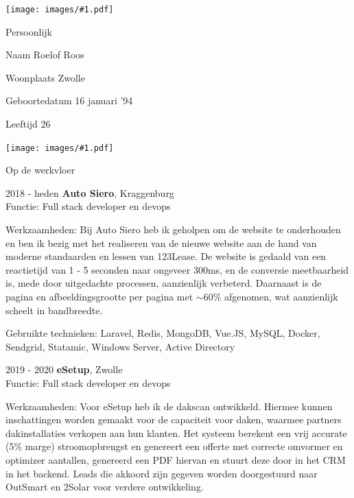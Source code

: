 \documentclass[12pt, a4paper]{article}
\newcommand*{\pdficon}[1]{
    \vspace{10mm}
    \hspace*{-25mm}
    \texttt{[image: images/\#1.pdf]}
    \vspace{-12mm}
}
\begin{document}
    \begin{cv}{}
        \pdficon{id}
        \begin{cvlist}{Persoonlijk}

            \item[Naam] Roelof Roos
            \item[Woonplaats] Zwolle
            \item[Geboortedatum] 16 januari '94
            \item[Leeftijd] 26

        \end{cvlist}

        \pdficon{work}
        \begin{cvlist}{Op de werkvloer}

            \item[2018 - heden] \textbf{Auto Siero}, Kraggenburg \\
                                Functie: Full stack developer en devops
                                \par
                                Werkzaamheden:
                                Bij Auto Siero heb ik geholpen om de website te onderhouden en ben ik bezig met het realiseren van
                                de nieuwe website aan de hand van moderne standaarden en lessen van 123Lease. De website is gedaald van een reactietijd van
                                1 - 5 seconden naar ongeveer 300ms, en de conversie meetbaarheid is, mede door uitgedachte processen, aanzienlijk verbeterd. Daarnaast
                                is de pagina en afbeeldingsgrootte per pagina met $\sim$60\% afgenomen, wat aanzienlijk scheelt in bandbreedte.

                                Gebruikte technieken: Laravel, Redis, MongoDB, Vue.JS, MySQL, Docker, Sendgrid, Statamic, Windows Server, Active Directory

            \item[2019 - 2020]  \textbf{eSetup}, Zwolle \\
                                Functie: Full stack developer en devops
                                \par

                                Werkzaamheden:
                                Voor eSetup heb ik de dakscan ontwikkeld. Hiermee kunnen inschattingen worden gemaakt voor
                                de capaciteit voor daken, waarmee partners dakinstallaties verkopen aan hun klanten. Het systeem
                                berekent een vrij accurate (5\% marge) stroomopbrengst en genereert een offerte met correcte omvormer
                                en optimizer aantallen, genereerd een PDF hiervan en stuurt deze door in het CRM in het backend.
                                Leads die akkoord zijn gegeven worden doorgestuurd naar OutSmart en 2Solar voor verdere ontwikkeling.


\end{cvlist}
\end{cv}
\end{document}
